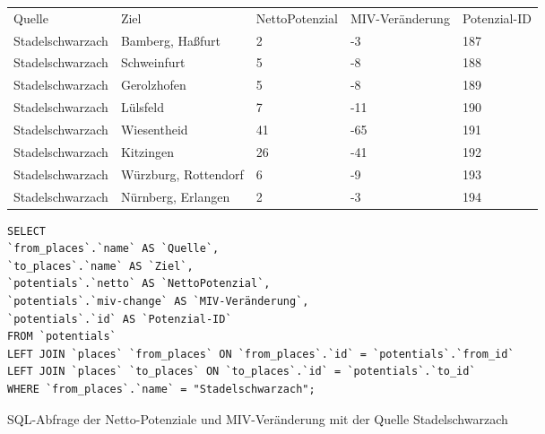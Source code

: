 \begin{tabular}{ l  l  l  l  l }
Quelle & Ziel & NettoPotenzial & MIV-Veränderung & Potenzial-ID\\ 
Stadelschwarzach & Bamberg, Haßfurt & 2 & -3 & 187\\ 
Stadelschwarzach & Schweinfurt & 5 & -8 & 188\\ 
Stadelschwarzach & Gerolzhofen & 5 & -8 & 189\\ 
Stadelschwarzach & Lülsfeld & 7 & -11 & 190\\ 
Stadelschwarzach & Wiesentheid & 41 & -65 & 191\\ 
Stadelschwarzach & Kitzingen & 26 & -41 & 192\\ 
Stadelschwarzach & Würzburg, Rottendorf & 6 & -9 & 193\\ 
Stadelschwarzach & Nürnberg, Erlangen & 2 & -3 & 194\\ 
\end{tabular}    
\newline
\newline
\begin{listing}[htbp]
\begin{verbatim}
SELECT
`from_places`.`name` AS `Quelle`, 
`to_places`.`name` AS `Ziel`, 
`potentials`.`netto` AS `NettoPotenzial`, 
`potentials`.`miv-change` AS `MIV-Veränderung`, 
`potentials`.`id` AS `Potenzial-ID`
FROM `potentials`
LEFT JOIN `places` `from_places` ON `from_places`.`id` = `potentials`.`from_id`
LEFT JOIN `places` `to_places` ON `to_places`.`id` = `potentials`.`to_id`
WHERE `from_places`.`name` = "Stadelschwarzach";
\end{verbatim}
\caption{SQL-Abfrage der Netto-Potenziale und MIV-Veränderung mit der Quelle Stadelschwarzach}\label{lst-fz-stadelschwarzach}
\end{listing}